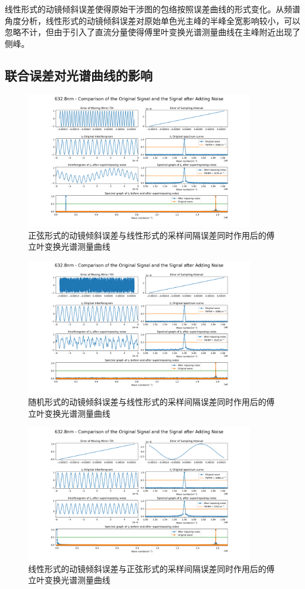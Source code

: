 \documentclass[conference]{IEEEtran}
\begin{document}
线性形式的动镜倾斜误差使得原始干涉图的包络按照误差曲线的形式变化。从频谱角度分析，线性形式的动镜倾斜误差对原始单色光主峰的半峰全宽影响较小，可以忽略不计，但由于引入了直流分量使得傅里叶变换光谱测量曲线在主峰附近出现了侧峰。

\subsection{联合误差对光谱曲线的影响}
\begin{figure}[htbp]
	\centerline{
		\includegraphics[width=10cm]{4.png} 	
	}
	\caption{正弦形式的动镜倾斜误差与线性形式的采样间隔误差同时作用后的傅立叶变换光谱测量曲线}
	\label{pic4}
\end{figure}

\begin{figure}[htbp]
	\centerline{
		\includegraphics[width=10cm]{5.png} 	
	}
	\caption{随机形式的动镜倾斜误差与线性形式的采样间隔误差同时作用后的傅立叶变换光谱测量曲线}
	\label{pic5}
\end{figure}

\begin{figure}[htbp]
	\centerline{
		\includegraphics[width=10cm]{6.png} 	
	}
	\caption{线性形式的动镜倾斜误差与正弦形式的采样间隔误差同时作用后的傅立叶变换光谱测量曲线}
	\label{pic6}
\end{figure}
\end{document}
